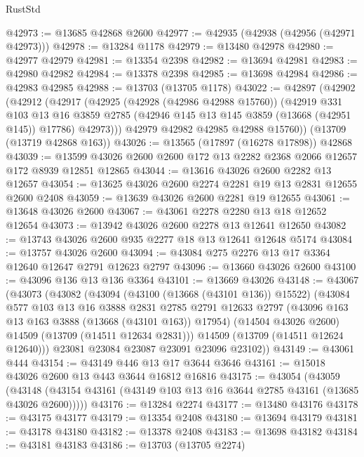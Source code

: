 \begin{lexlean}{RustStd}
\begin{coremodule}
@42973 := @13685 @42868 @2600
@42977 := @42935 (@42938 (@42956 (@42971 @42973)))
@42978 := @13284 @1178
@42979 := @13480 @42978
@42980 := @42977 @42979
@42981 := @13354 @2398
@42982 := @13694 @42981
@42983 := @42980 @42982
@42984 := @13378 @2398
@42985 := @13698 @42984
@42986 := @42983 @42985
@42988 := @13703 (@13705 @1178)
@43022 := @42897
    (@42902
      (@42912
        (@42917
          (@42925
            (@42928 (@42986 @42988 @15760))
            (@42919
              @331
              @103
              @13
              @16
              @3859
              @2785
              (@42946 @145 @13 @145 @3859 (@13668 (@42951 @145)) @17786)
              @42973)))
        @42979
        @42982
        @42985
        @42988
        @15760))
    (@13709 (@13719 @42868 @163))
@43026 := @13565 (@17897 (@16278 @17898)) @42868
@43039 := @13599 @43026 @2600 @2600 @172 @13 @2282 @2368 @2066 @12657 @172 @8939 @12851 @12865
@43044 := @13616 @43026 @2600 @2282 @13 @12657
@43054 := @13625 @43026 @2600 @2274 @2281 @19 @13 @2831 @12655 @2600 @2408
@43059 := @13639 @43026 @2600 @2281 @19 @12655
@43061 := @13648 @43026 @2600
@43067 := @43061 @2278 @2280 @13 @18 @12652 @12654
@43073 := @13942 @43026 @2600 @2278 @13 @12641 @12650
@43082 := @13743 @43026 @2600 @935 @2277 @18 @13 @12641 @12648 @5174
@43084 := @13757 @43026 @2600
@43094 := @43084 @275 @2276 @13 @17 @3364 @12640 @12647 @2791 @12623 @2797
@43096 := @13660 @43026 @2600
@43100 := @43096 @136 @13 @136 @3364
@43101 := @13669 @43026
@43148 := @43067
    (@43073
      (@43082
        (@43094
          (@43100 (@13668 (@43101 @136)) @15522)
          (@43084
            @577
            @103
            @13
            @16
            @3888
            @2831
            @2785
            @2791
            @12633
            @2797
            (@43096 @163 @13 @163 @3888 (@13668 (@43101 @163)) @17954)
            (@14504 @43026 @2600)
            @14509
            (@13709 (@14511 @12634 @2831)))
          @14509
          (@13709 (@14511 @12624 @12640)))
        @23081
        @23084
        @23087
        @23091
        @23096
        @23102))
@43149 := @43061 @444
@43154 := @43149 @446 @13 @17 @3644 @3646
@43161 := @15018 @43026 @2600 @13 @443 @3644 @16812 @16816
@43175 := @43054
    (@43059 (@43148 (@43154 @43161 (@43149 @103 @13 @16 @3644 @2785 @43161 (@13685 @43026 @2600)))))
@43176 := @13284 @2274
@43177 := @13480 @43176
@43178 := @43175 @43177
@43179 := @13354 @2408
@43180 := @13694 @43179
@43181 := @43178 @43180
@43182 := @13378 @2408
@43183 := @13698 @43182
@43184 := @43181 @43183
@43186 := @13703 (@13705 @2274)

\end{coremodule}
\end{lexlean}
